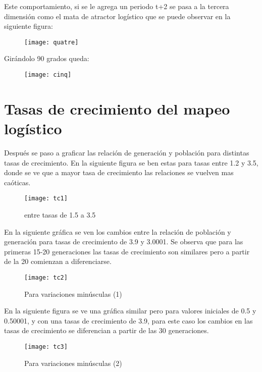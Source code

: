 \documentclass[12pt,letterpaper]{article}
\begin{document}
Este comportamiento, si se le agrega un periodo t+2 se pasa a la tercera dimensión como el mata de atractor logístico que se puede observar en la siguiente figura:

\begin{figure}[H]
	\centering
	\texttt{[image: quatre]}
	\caption{}
\end{figure}

Girándolo 90 grados queda:

\begin{figure}[H]
	\centering
	\texttt{[image: cinq]}
	\caption{}
\end{figure}



\section{Tasas de crecimiento del mapeo logístico}


Después se paso a graficar las relación de generación y población para distintas tasas de crecimiento. En la siguiente figura se ben estas para tasas entre 1.2 y 3.5, donde se ve que a mayor tasa de crecimiento las relaciones se vuelven mas caóticas.

\begin{figure}[H]
	\centering
	\texttt{[image: tc1]}
	\caption{ entre tasas de 1.5 a 3.5}
\end{figure}

En la siguiente gráfica se ven los cambios entre la relación de población y generación para tasas de crecimiento de 3.9 y 3.0001. Se observa que para las primeras 15-20 generaciones las tasas de crecimiento son similares pero a partir de  la 20 comienzan a diferenciarse.


\begin{figure}[H]
	\centering
	\texttt{[image: tc2]}
	\caption{Para variaciones minúsculas (1)}
\end{figure}

En la siguiente figura se ve una gráfica similar pero para valores iniciales de 0.5 y 0.50001, y con una tasas de crecimiento de 3.9, para este caso los cambios en las tasas de crecimiento se diferencian a partir de las 30 generaciones.

\begin{figure}[H]
	\centering
	\texttt{[image: tc3]}
	\caption{Para variaciones minúsculas (2)}
\end{figure}
\end{document}
